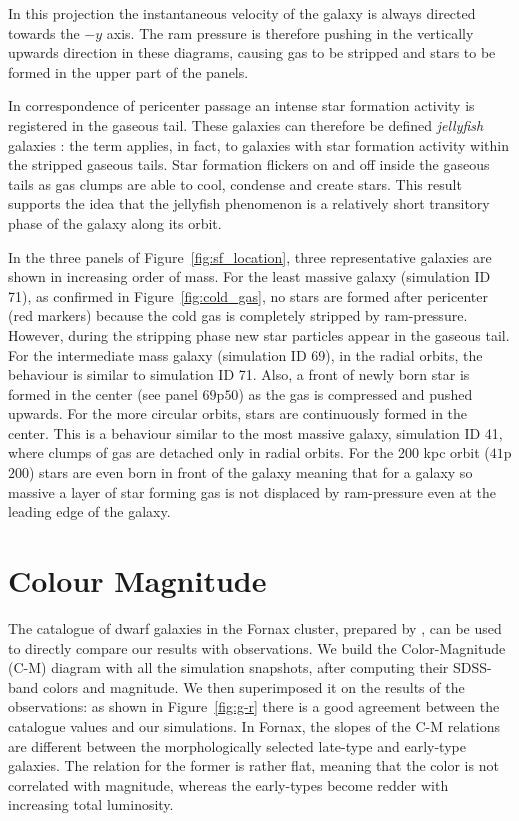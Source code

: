 In this projection the instantaneous velocity of the galaxy is always directed towards the $-y$ axis.
The ram pressure is therefore pushing in the vertically upwards direction in these diagrams, causing gas to be stripped and stars to be formed in the upper part of the panels.

In correspondence of pericenter passage an intense star formation activity is registered in the gaseous tail.
These galaxies can therefore be defined \emph{jellyfish} galaxies \citep{Ebeling2013}:
the term applies, in fact, to galaxies with star formation activity within the stripped gaseous tails.
Star formation flickers on and off inside the gaseous tails as gas clumps are able to cool, condense and create stars.
This result supports the idea that the jellyfish phenomenon is a relatively short transitory phase of the galaxy along its orbit.

In the three panels of Figure~\ref{fig:sf_location}, three representative galaxies are shown in increasing order of mass.
For the least massive galaxy (simulation ID 71), as confirmed in Figure~\ref{fig:cold_gas}, no stars are formed after pericenter (red markers) because the cold gas is completely stripped by ram-pressure.
However, during the stripping phase new star particles appear in the gaseous tail.
For the intermediate mass galaxy (simulation ID 69), in the radial orbits, the behaviour is similar to simulation ID 71.
Also, a front of newly born star is formed in the center (see panel $69$p$50$) as the gas is compressed and pushed upwards.
For the more circular orbits, stars are continuously formed in the center.
This is a behaviour similar to the most massive galaxy, simulation ID 41, where clumps of gas are detached only in radial orbits.
For the 200 kpc orbit ($41$p$200$) stars are even born in front of the galaxy meaning that for a galaxy so massive a layer of star forming gas is not displaced by ram-pressure even at the leading edge of the galaxy.

\section{Colour Magnitude} \label{sec:CM}
The catalogue of dwarf galaxies in the Fornax cluster, prepared by \citet{Venhola2019}, can be used to directly compare our results with observations.
We build the Color-Magnitude (C-M) diagram with all the simulation snapshots, after computing their SDSS-band colors and magnitude.
We then superimposed it on the results of the observations: as shown in Figure~\ref{fig:g-r} there is a good agreement between the catalogue values and our simulations.
In Fornax, the slopes of the C-M relations are different between the morphologically selected late-type and early-type galaxies.
The relation for the former is rather flat, meaning that the color is not correlated with magnitude, whereas the early-types become redder with increasing total luminosity.

